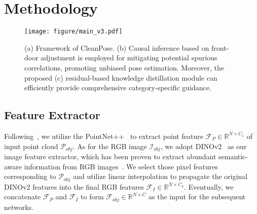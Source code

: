 
\section{Methodology}
\label{sec:Methodology}

\begin{figure*}[htbp]
    \texttt{[image: figure/main\_v3.pdf]}
    \caption{(a) Framework of CleanPose. (b) Causal inference based on front-door adjustment is employed for mitigating potential spurious correlations, promoting unbiased pose estimation. Moreover, the proposed (c) residual-based knowledge distillation module can efficiently provide comprehensive category-specific guidance.
    }\label{fig:CleanPose}
    \vspace{-0.4cm} 
\end{figure*}


\subsection{Feature Extractor}
\label{sec:feature_extractor}
Following~\cite{lin2024instance}, we utilize the PointNet++~\cite{qi2017pointnet++} to extract point feature $\mathcal{F}_{P} \in \mathbb{R}^{N \times C_1}$ of input point cloud $\mathcal{P}_{obj}$.
As for the RGB image $\mathcal{I}_{obj}$, we adopt DINOv2~\cite{oquab2024dinov2} as our image feature extractor, which has been proven to extract abundant semantic-aware information from RGB images~\cite{peng2024sam}. We select those pixel features corresponding to $\mathcal{P}_{obj}$ and utilize linear interpolation to propagate the original DINOv2 features into the final RGB features $\mathcal{F}_{I} \in \mathbb{R}^{N \times C_2}$. Eventually, we concatenate $\mathcal{F}_{P}$ and $\mathcal{F}_{I}$ to form $\mathcal{F}_{obj} \in \mathbb{R}^{N \times C}$ as the input for the subsequent networks.


